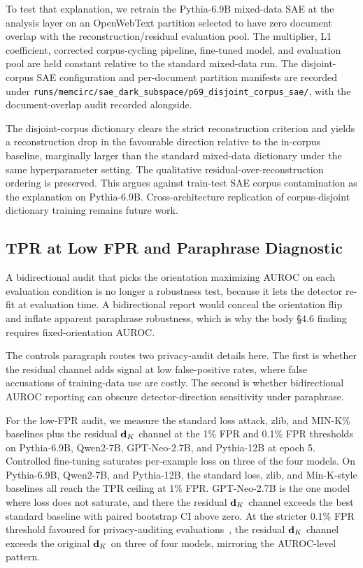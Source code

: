 To test that explanation, we retrain the Pythia-6.9B mixed-data SAE at the analysis layer on an OpenWebText partition selected to have zero document overlap with the reconstruction/residual evaluation pool. The multiplier, L1 coefficient, corrected corpus-cycling pipeline, fine-tuned model, and evaluation pool are held constant relative to the standard mixed-data run. The disjoint-corpus SAE configuration and per-document partition manifests are recorded under \texttt{runs/\allowbreak{}memcirc/\allowbreak{}sae\_\allowbreak{}dark\_\allowbreak{}subspace/\allowbreak{}p69\_\allowbreak{}disjoint\_\allowbreak{}corpus\_\allowbreak{}sae/\allowbreak{}}, with the document-overlap audit recorded alongside.

The disjoint-corpus dictionary clears the strict reconstruction criterion and yields a reconstruction drop in the favourable direction relative to the in-corpus baseline, marginally larger than the standard mixed-data dictionary under the same hyperparameter setting. The qualitative residual-over-reconstruction ordering is preserved. This argues against train-test SAE corpus contamination as the explanation on Pythia-6.9B. Cross-architecture replication of corpus-disjoint dictionary training remains future work.

\subsection{TPR at Low FPR and Paraphrase Diagnostic}
\label{app:tpr_paraphrase}

A bidirectional audit that picks the orientation maximizing AUROC on each evaluation condition is no longer a robustness test, because it lets the detector re-fit at evaluation time. A bidirectional report would conceal the orientation flip and inflate apparent paraphrase robustness, which is why the body §4.6 finding requires fixed-orientation AUROC.

The controls paragraph routes two privacy-audit details here. The first is whether the residual channel adds signal at low false-positive rates, where false accusations of training-data use are costly. The second is whether bidirectional AUROC reporting can obscure detector-direction sensitivity under paraphrase.

For the low-FPR audit, we measure the standard loss attack, zlib, and MIN-K\% baselines plus the residual $\mathbf{d}_K$ channel at the 1\% FPR and 0.1\% FPR thresholds on Pythia-6.9B, Qwen2-7B, GPT-Neo-2.7B, and Pythia-12B at epoch 5. Controlled fine-tuning saturates per-example loss on three of the four models. On Pythia-6.9B, Qwen2-7B, and Pythia-12B, the standard loss, zlib, and Min-K-style baselines all reach the TPR ceiling at 1\% FPR. GPT-Neo-2.7B is the one model where loss does not saturate, and there the residual $\mathbf{d}_K$ channel exceeds the best standard baseline with paired bootstrap CI above zero. At the stricter 0.1\% FPR threshold favoured for privacy-auditing evaluations~\citep{chen2026wbc, ilic2026ezmia}, the residual $\mathbf{d}_K$ channel exceeds the original $\mathbf{d}_K$ on three of four models, mirroring the AUROC-level pattern.

